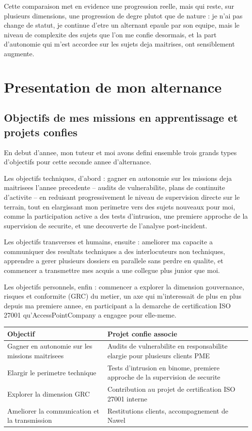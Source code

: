 \documentclass[11pt,a4paper]{article}
\begin{document}
Cette comparaison met en evidence une progression reelle, mais qui reste, sur plusieurs dimensions, une progression de degre plutot que de nature : je n'ai pas change de statut, je continue d'etre un alternant epaule par son equipe, mais le niveau de complexite des sujets que l'on me confie desormais, et la part d'autonomie qui m'est accordee sur les sujets deja maitrises, ont sensiblement augmente.

\newpage
\section{Presentation de mon alternance}

\subsection{Objectifs de mes missions en apprentissage et projets confies}

En debut d'annee, mon tuteur et moi avons defini ensemble trois grands types d'objectifs pour cette seconde annee d'alternance.

Les objectifs techniques, d'abord : gagner en autonomie sur les missions deja maitrisees l'annee precedente -- audits de vulnerabilite, plans de continuite d'activite -- en reduisant progressivement le niveau de supervision directe sur le terrain, tout en elargissant mon perimetre vers des sujets nouveaux pour moi, comme la participation active a des tests d'intrusion, une premiere approche de la supervision de securite, et une decouverte de l'analyse post-incident.

Les objectifs transverses et humains, ensuite : ameliorer ma capacite a communiquer des resultats techniques a des interlocuteurs non techniques, apprendre a gerer plusieurs dossiers en parallele sans perdre en qualite, et commencer a transmettre mes acquis a une collegue plus junior que moi.

Les objectifs personnels, enfin : commencer a explorer la dimension gouvernance, risques et conformite (GRC) du metier, un axe qui m'interessait de plus en plus depuis ma premiere annee, en participant a la demarche de certification ISO 27001 qu'AccessPointCompany a engagee pour elle-meme.

\begin{center}
\small
\begin{tabular}{@{}p{5.0cm}p{9.0cm}@{}}
\toprule
\textbf{Objectif} & \textbf{Projet confie associe} \\
\midrule
Gagner en autonomie sur les missions maitrisees &
Audits de vulnerabilite en responsabilite elargie pour plusieurs clients PME \\
Elargir le perimetre technique &
Tests d'intrusion en binome, premiere approche de la supervision de securite \\
Explorer la dimension GRC &
Contribution au projet de certification ISO 27001 interne \\
Ameliorer la communication et la transmission &
Restitutions clients, accompagnement de Nawel \\
\bottomrule
\end{tabular}
\end{center}
\end{document}

